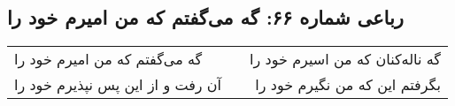 \begin{center}
\section*{رباعی شماره ۶۶: گه می‌گفتم که من امیرم خود را}
\label{sec:0066}
\begin{longtable}{l p{0.5cm} r}
گه می‌گفتم که من امیرم خود را
&&
گه ناله‌کنان که من اسیرم خود را
\\
آن رفت و از این پس نپذیرم خود را
&&
بگرفتم این که من نگیرم خود را
\\
\end{longtable}
\end{center}
